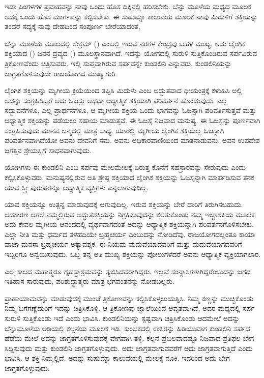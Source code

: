 ಇಡಾ ಪಿಂಗಳಗಳ ಪ್ರವಾಹವನ್ನು ನಾವು ಒಂದು ಹೊಸ ದಿಕ್ಕಿನಲ್ಲಿ ಹರಿಸಬೇಕು. ಬೆನ್ನು ಮೂಳೆಯ ಮಧ್ಯದ ಮೂಲಕ ಅದಕ್ಕೆ ಒಂದು ಹೊಸ ಮಾರ್ಗವನ್ನು ಕಲ್ಪಿಸಬೇಕು. ಈ ಸುಷುಮ್ನಾ ಕಾಲುವೆಯ ಮೂಲಕ ನಾವು ಮಿದುಳಿಗೆ ಶಕ್ತಿಯನ್ನು ತಂದರೆ ಸದ್ಯಕ್ಕೆ ನಾವು ದೇಹದಿಂದ ಸಂಪೂರ್ಣ ಬೇರೆಯಾದಂತೆ,

ಬೆನ್ನು ಮೂಳೆಯ ಮೂಲದಲ್ಲಿ ಸೇಕ್ರಮ್ () ಎಂಬಲ್ಲಿ ಇರುವ ನರಗಳ ಕೇಂದ್ರವು ಬಹಳ ಮುಖ್ಯ. ಅದು ಲೈಂಗಿಕ ಶಕ್ತಿಯಾದ () ಜನನ ದ್ರವ್ಯದ () ಮೂಲಸ್ಥಾನವಾಗಿದೆ. ಇದನ್ನು ಯೋಗದಲ್ಲಿ ಸುರುಳಿ ಸುತ್ತಿಕೊಂಡಿರುವ ಸರ್ಪವಿರುವ ತ್ರಿಕೋಣವೆಂದು ಚಿತ್ರಿಸುವರು. ಇಲ್ಲಿ ಸುಪ್ತವಾಗಿರುವ ಸರ್ಪವನ್ನೇ ಕುಂಡಲಿನಿ ಎನ್ನುವರು. ಕುಂಡಲಿನಿಯನ್ನು ಜಾಗ್ರತಗೊಳಿಸುವುದೇ ರಾಜಯೋಗದ ಮುಖ್ಯ ಗುರಿ.

ಲೈಂಗಿಕ ಶಕ್ತಿಯನ್ನು ಮೃಗೀಯ ಕ್ರಿಯೆಯಿಂದ ತಪ್ಪಿಸಿ ಮಿದುಳು ಎಂಬ ಅದ್ಭುತವಾದ ಧೀಯಂತ್ರಕ್ಕೆ ಕಳುಹಿಸಿ ಅಲ್ಲಿ ಅದನ್ನು ಸಂಗ್ರಹಿಸಿಟ್ಟರೆ ಅದು ಓಜಸ್ಸು ಅಥವಾ ಆಧ್ಯಾತ್ಮಿಕ ಶಕ್ತಿಯಾಗಿ ಪರಿವರ್ತನೆ ಹೊಂದುವುದು. ಎಲ್ಲ ಸದ್ಭಾವನೆಗಳೂ, ಎಲ್ಲ ಪ್ರಾರ್ಥನೆಗಳೂ, ಆ ಮೃಗೀಯ ಶಕ್ತಿಯ ಒಂದು ಭಾಗವನ್ನು ಓಜಸ್ಸಾಗಿ ಪರಿವರ್ತಿಸುತ್ತವೆ ಮತ್ತು ಆಧ್ಯಾತ್ಮಿಕ ಶಕ್ತಿಯನ್ನು ಪಡೆಯಲು ಸಹಾಯ ಮಾಡುತ್ತವೆ. ಈ ಓಜಸ್ಸೆ ನಿಜವಾದ ಮನುಷ್ಯ. ಈ ಓಜಸ್ಸನ್ನು ಪೂರ್ಣವಾಗಿ ಸಂಗ್ರಹಿಸುವುದು ಮಾನವ ಜನ್ಮದಲ್ಲಿ ಮಾತ್ರ ಸಾಧ್ಯ. ಯಾರಲ್ಲಿ ಮೃಗೀಯ ಲೈಂಗಿಕ ಶಕ್ತಿಯೆಲ್ಲ ಓಜಸ್ಸಾಗಿ ಪರಿವರ್ತನವಾಗಿದೆಯೋ ಅವನು ದೇವನಿಗೆ ಸಮ. ಅವನು ಅಧಿಕಾರವಾಣಿಯಿಂದ ಮಾತನಾಡುವನು. ಅವನ ಉಪದೇಶ ಜಗತ್ತಿನ ಶ್ರೇಯಸ್ಸಿಗೆ ಸಾಧನವಾಗುವುದು.

ಯೋಗಿಗಳು ಈ ಕುಂಡಲಿನಿ ಎಂಬ ಸರ್ಪವು ಮೇಲಮೇಲಕ್ಕೆ ಏರುತ್ತ ಕೊನೆಗೆ ಸಹಸ್ರಾರವನ್ನು ಸೇರುವುದು ಎಂದು ಕಲ್ಪಿಸಿಕೊಳ್ಳುವರು. ಮನುಷ್ಯನಲ್ಲಿರುವ ಅತಿ ಶ್ರೇಷ್ಠ ಶಕ್ತಿಯಾದ ಲೈಂಗಿಕ ಶಕ್ತಿಯನ್ನು ಓಜಸ್ಸನ್ನಾಗಿ ಮಾರ್ಪಡಿಸುವ ತನಕ ಯಾವ ಸ್ತ್ರೀ ಪುರುಷರನ್ನೂ ಆಧ್ಯಾತ್ಮಿಕ ವ್ಯಕ್ತಿಗಳು ಎನ್ನಲಾಗುವುದಿಲ್ಲ.

ಯಾವ ಶಕ್ತಿಯನ್ನೂ ಉತ್ಪನ್ನ ಮಾಡುವುದಕ್ಕೆ ಆಗುವುದಿಲ್ಲ. ಇರುವ ಶಕ್ತಿಯನ್ನು ಬೇರೆ ದಾರಿಗೆ ತಿರುಗಿಸಬಹುದು. ಆದಕಾರಣ ಆಗಲೆ ನಮ್ಮಲ್ಲಿರುವ ಅದ್ಭುತಶಕ್ತಿಯನ್ನು ನಿಗ್ರಹಿಸುವುದನ್ನು ಕಲಿತುಕೊಂಡು ನಮ್ಮ ಇಚ್ಛಾಶಕ್ತಿಯ ಮೂಲಕ ಅದು ಕೇವಲ ಮೃಗೀಯ ಆನಂದದಲ್ಲಿ ವ್ಯರ್ಥವಾಗದಂತೆ ಅದನ್ನು ಆಧ್ಯಾತ್ಮಿಕ ಶಕ್ತಿಯನ್ನಾಗಿ ಪರಿವರ್ತನಗೊಳಿಸಬೇಕು. ಎಲ್ಲಾ ನೀತಿ ಮತ್ತು ಧರ್ಮದ ತಳಹದಿಯೇ ಬ್ರಹ್ಮಚರ್ಯ ಎಂಬುದನ್ನು ನೋಡಿದೆವು. ರಾಜಯೋಗದಲ್ಲಂತೂ ಕಾಯಾ ವಾಚಾ ಮನಸಾ ಬ್ರಹ್ಮಚರ್ಯ ಅತ್ಯಾವಶ್ಯಕ. ಈ ನಿಯಮ ಮದುವೆಯಾದವರಿಗೆ ಮತ್ತು ಮದುವೆಯಾಗದವರಿಗೆ ಇಬ್ಬರಿಗೂ ಅನ್ವಯಿಸುವುದು. ಒಬ್ಬ ತನ್ನ ಅತಿ ಮುಖ್ಯ ಶಕ್ತಿಯನ್ನು ಪೋಲುಗಳೆದರೆ ಅವನು ಆಧ್ಯಾತ್ಮಿಕ ವ್ಯಕ್ತಿಯಾಗಲಾರ.

ಎಲ್ಲ ಕಾಲದ ಮಹಾತ್ಮರೂ ಗೃಹಸ್ಥಾಶ್ರಮವನ್ನು ತ್ಯಜಿಸಿದವರಾಗಿದ್ದರು. ಇಲ್ಲವೆ ಸಂನ್ಯಾಸಿಗಳಾಗಿದ್ದರೆಂಬುದನ್ನು ಜಗದ ಇತಿಹಾಸ ಸಾರುವುದು, ಪರಿಶುದ್ಧಾತ್ಮರು ಮಾತ್ರ ಭಗವಂತನನ್ನು ನೋಡಬಲ್ಲರು.

ಪ್ರಾಣಾಯಾಮವನ್ನು ಮಾಡುವುದಕ್ಕೆ ಮುಂಚೆ ತ್ರಿಕೋಣವನ್ನು ಕಲ್ಪಿಸಿಕೊಳ್ಳಲು\break ಯತ್ನಿಸಿ. ನಿಮ್ಮ ಕಣ್ಣನ್ನು ಮುಚ್ಚಿಕೊಂಡು ನಿಮ್ಮ ಬಗೆಗಣ್ಣೆದುರಿಗೆ ಇದನ್ನು ಚಿತ್ರಿಸಿಕೊಳ್ಳಿ. ಆ ತ್ರಿಕೋಣವು ಜ್ವಾಲೆಯಿಂದ ಆವೃತವಾಗಿದೆ, ಅದರ ಮಧ್ಯದಲ್ಲಿ ಸರ್ಪ ಸುರುಳಿ ಸುತ್ತಿಕೊಂಡು ಇದೆ ಎಂದು ಭಾವಿಸಿ. ಕುಂಡಲಿನಿಯನ್ನು ಸ್ಪಷ್ಟವಾಗಿ ಚಿತ್ರಿಸಿಕೊಂಡು ಆದಮೇಲೆ ಅದನ್ನು ಬೆನ್ನುಮೂಳೆಯ ಅಡಿಯಲ್ಲಿ ಕಲ್ಪನೆಯ ಮೂಲಕ ಇಡಿ. ಕುಂಭಕದಲ್ಲಿ ಉಸಿರನ್ನು ಹಿಡಿಯುವಾಗ ಕುಂಡಲಿನಿ ಸರ್ಪದ ಹೆಡೆಯ ಮೇಲೆ ಅದನ್ನು ಜಾಗ್ರತಗೊಳಿಸುವುದಕ್ಕೆ ವೇಗವಾಗಿ ತಳ್ಳಿ. ಕಲ್ಪನೆ ಪ್ರಬಲವಾದಷ್ಟೂ ನಿಜವಾದ ಪ್ರತಿಫಲ ಬೇಗ ಸಿದ್ದಿಸುವುದು ಮತ್ತು ಕುಂಡಲಿನಿ ಜಾಗ್ರತಗೊಳ್ಳುವುದು. ಅದು ಜಾಗ್ರತವಾಗುವವರೆಗೆ ಅದು ಜಾಗ್ರತವಾಗುತ್ತಿದೆ ಎಂದು ಭಾವಿಸಿ. ಆ ಶಕ್ತಿ ನಿಮ್ಮಲ್ಲಿದೆ. ಅದನ್ನು ಸುಷುಮ್ನಾ ಕಾಲುವೆಯಲ್ಲಿ ಮೇಲಕ್ಕೆ ನೂಕಿ. ಇದರಿಂದ ಅದು ಬೇಗ ಜಾಗ್ರತಗೊಳ್ಳುವುದು.

